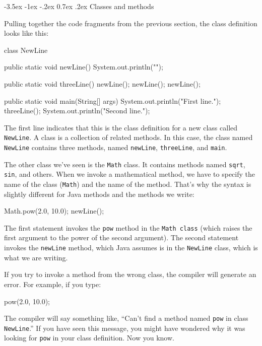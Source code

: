 \documentclass{book}
\makeatletter
\renewcommand{\section}{\@startsection 
    {section} {1} {0mm}%
    {-3.5ex \@plus -1ex \@minus -.2ex}%
    {0.7ex \@plus.2ex}%
    {\normalfont\Large\bfseries}}
\makeatother
\begin{document}
\section{Classes and methods}

Pulling together the code fragments from the previous
section, the class definition looks like this:

\begin{verbatimtab}
class NewLine {

  public static void newLine() {
    System.out.println("");
  }

  public static void threeLine() {
    newLine();  newLine();  newLine();
  }

  public static void main(String[] args) {
    System.out.println("First line.");
    threeLine();
    System.out.println("Second line.");
  }
}
\end{verbatimtab}
%
The first line indicates that this is the class definition for a new
class called {\tt NewLine}.  A class is a collection of related
methods.  In this case, the class named {\tt NewLine} contains three
methods, named {\tt newLine}, {\tt threeLine}, and {\tt main}.

The other class we've seen is the {\tt Math} class.  It contains
methods named {\tt sqrt}, {\tt sin}, and others.  When
we invoke a mathematical method, we have to specify
the name of the class ({\tt Math}) and the name of the method.
That's why the syntax is slightly different for Java
methods and the methods we write:

\begin{verbatimtab}
    Math.pow(2.0, 10.0);
    newLine();
\end{verbatimtab}
%
The first statement invokes the {\tt pow} method in
the {\tt Math class} (which raises the first argument to the
power of the second argument).  The second statement invokes
the {\tt newLine} method, which Java assumes 
is in the {\tt NewLine} class, which is what we are writing.

If you try to invoke a method from the wrong class, the
compiler will generate an error.  For example, if you
type:

\begin{verbatimtab}
    pow(2.0, 10.0);
\end{verbatimtab}
%
The compiler will say something like, ``Can't find a method
named {\tt pow} in class {\tt NewLine}.''  If you have
seen this message, you might have wondered why it was looking
for {\tt pow} in your class definition.  Now you know.
\end{document}
